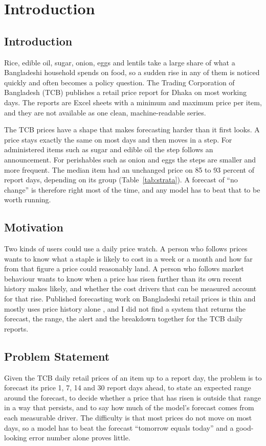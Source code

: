 \chapter{Introduction}

\section{Introduction}
Rice, edible oil, sugar, onion, eggs and lentils take a large share of what a Bangladeshi household spends on food, so a sudden rise in any of them is noticed quickly and often becomes a policy question. The Trading Corporation of Bangladesh (TCB) publishes a retail price report for Dhaka on most working days. The reports are Excel sheets with a minimum and maximum price per item, and they are not available as one clean, machine-readable series.

The TCB prices have a shape that makes forecasting harder than it first looks. A price stays exactly the same on most days and then moves in a step. For administered items such as sugar and edible oil the step follows an announcement. For perishables such as onion and eggs the steps are smaller and more frequent. The median item had an unchanged price on 85 to 93 percent of report days, depending on its group (Table~\ref{tab:strata}). A forecast of ``no change'' is therefore right most of the time, and any model has to beat that to be worth running.

\section{Motivation}
Two kinds of users could use a daily price watch. A person who follows prices wants to know what a staple is likely to cost in a week or a month and how far from that figure a price could reasonably land. A person who follows market behaviour wants to know when a price has risen further than its own recent history makes likely, and whether the cost drivers that can be measured account for that rise. Published forecasting work on Bangladeshi retail prices is thin and mostly uses price history alone \cite{agripricebd}, and I did not find a system that returns the forecast, the range, the alert and the breakdown together for the TCB daily reports.

\section{Problem Statement}
Given the TCB daily retail prices of an item up to a report day, the problem is to forecast its price 1, 7, 14 and 30 report days ahead, to state an expected range around the forecast, to decide whether a price that has risen is outside that range in a way that persists, and to say how much of the model's forecast comes from each measurable driver. The difficulty is that most prices do not move on most days, so a model has to beat the forecast ``tomorrow equals today'' and a good-looking error number alone proves little.

